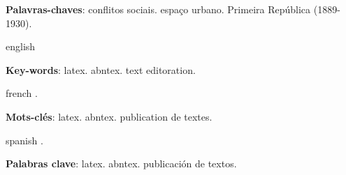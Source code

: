 \documentclass[
	12pt,					%
	openright,			%
	twoside,			%
	a4paper,			%
	english,				%
	french,				%
	spanish,			%
	brazil				%
	]{abntex2}
\begin{document}
\begin{agradecimentos}

\lipsum[50]

\end{agradecimentos}

\begin{epigrafe}
    \vspace*{\fill}
	\begin{flushright}
		\textit{\lipsum[2]}
	\end{flushright}
\end{epigrafe}


\setlength{\absparsep}{18pt} %
\begin{resumo}
 \lipsum[50]
 \textbf{Palavras-chaves}: conflitos sociais. espaço urbano. Primeira República (1889-1930).
\end{resumo}

\begin{resumo}[Abstract]
 \begin{otherlanguage*}{english}
\lipsum[50]
   \vspace{\onelineskip}
 
   \noindent 
   \textbf{Key-words}: latex. abntex. text editoration.
 \end{otherlanguage*}
\end{resumo}

\begin{resumo}[Résumé]
 \begin{otherlanguage*}{french}
\lipsum[50].
 
   \textbf{Mots-clés}: latex. abntex. publication de textes.
 \end{otherlanguage*}
\end{resumo}

\begin{resumo}[Resumen]
 \begin{otherlanguage*}{spanish}
\lipsum[50].
  
   \textbf{Palabras clave}: latex. abntex. publicación de textos.
 \end{otherlanguage*}
\end{resumo}

\end{document}
